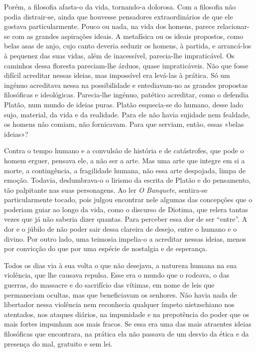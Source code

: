 Porém, a filosofia afasta-o da vida, tornando-a dolorosa. Com a
filosofia não podia distrair-se, ainda que houvesse pensadores
extraordinários de que ele gostava particularmente. Pouco ou nada, na
vida dos homens, parece relacionar-se com as grandes aspirações ideais.
A metafísica ou os ideais propostos, como belas asas de anjo, cujo canto
deveria seduzir os homens, à partida, e arrancá-los à pequenez das suas
vidas, além de inacessível, parecia-lhe impraticável. Os caminhos dessa
floresta pareciam-lhe árduos, quase impraticáveis. Não que fosse difícil
acreditar nessas ideias, mas impossível era levá-las à prática. Só um
ingénuo acreditava nessa na possibilidade e entediavam-no as grandes
propostas filosóficas e ideológicas. Parecia-lhe ingénuo, patético
acreditar, como o defendia Platão, num mundo de ideias puras. Platão
esquecia-se do humano, desse lado sujo, material, da vida e da
realidade. Para ele não havia sujidade nem fealdade, os homens não
comiam, não fornicavam. Para que serviam, então, essas «belas ideias»?

Contra o tempo humano e a convulsão de história e de catástrofes, que
pode o homem erguer, pensava ele, a não ser a arte. Mas uma arte que
integre em si a morte, a contingência, a fragilidade humana, não essa
arte despojada, limpa de emoção. Todavia, deslumbrava-o o lirismo da
escrita de Platão e do pensamento, tão palpitante nas suas personagens.
Ao ler \emph{O Banquete}, sentira-se particularmente tocado, pois julgou
encontrar nele algumas das concepções que o poderiam guiar ao longo da
vida, como o discurso de Diotima, que relera tantas vezes que já não
saberia dizer quantas. Para perceber essa dor de ser ``entre''. A dor e
o júbilo de não poder sair dessa clareira de desejo, entre o humano e o
divino. Por outro lado, uma teimosia impelia-o a acreditar nessas
ideias, menos por convicção do que por uma espécie de nostalgia e de
esperança.

Todos os dias via à sua volta o que não desejava, a natureza humana na
sua violência, que lhe causava repulsa. Esse era o mundo que o rodeava,
o das guerras, do massacre e do sacrifício das vítimas, em nome de leis
que permaneciam ocultas, mas que beneficiavam os senhores. Não havia
nada de libertador nessa violência nem reconhecia qualquer ímpeto
nietzschiano nos atentados, nos ataques diários, na impunidade e na
prepotência do poder que os mais fortes impunham aos mais fracos. Se
essa era uma das mais atraentes ideias filosóficas que encontrara, na
prática ela não passava de um desvio da ética e da presença do mal,
gratuito e sem lei.

